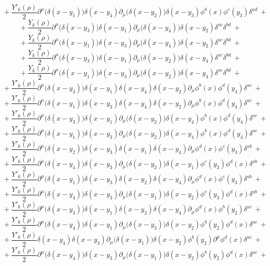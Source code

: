 $$+\ \frac{Y'_k(\rho)}{2}\partial^\mu\big(\delta(x - y_1)\big)\delta(x - y_4)\partial_\mu\big(\delta(x - y_2)\big)\delta(x - y_3)\phi^b(x)\phi^c(y_3)\delta^{ad} \ +$$
$$+\ \frac{Y_k(\rho)}{2}\partial^\mu\big(\delta(x - y_3)\big)\delta(x - y_1)\partial_\mu\big(\delta(x - y_4)\big)\delta(x - y_2)\delta^{ac}\delta^{bd} \ +$$
$$+\ \frac{Y_k(\rho)}{2}\partial^\mu\big(\delta(x - y_1)\big)\delta(x - y_3)\partial_\mu\big(\delta(x - y_4)\big)\delta(x - y_2)\delta^{ac}\delta^{bd} \ +$$
$$+\ \frac{Y_k(\rho)}{2}\partial^\mu\big(\delta(x - y_3)\big)\delta(x - y_1)\partial_\mu\big(\delta(x - y_2)\big)\delta(x - y_4)\delta^{ac}\delta^{bd} \ +$$
$$+\ \frac{Y_k(\rho)}{2}\partial^\mu\big(\delta(x - y_1)\big)\delta(x - y_3)\partial_\mu\big(\delta(x - y_2)\big)\delta(x - y_4)\delta^{ac}\delta^{bd} \ +$$
$$+\ \frac{Y'_k(\rho)}{2}\partial^\mu\big(\delta(x - y_3)\big)\delta(x - y_1)\delta(x - y_4)\delta(x - y_2)\partial_\mu\phi^b(x)\phi^d(y_4)\delta^{ac} \ +$$
$$+\ \frac{Y'_k(\rho)}{2}\partial^\mu\big(\delta(x - y_1)\big)\delta(x - y_3)\delta(x - y_4)\delta(x - y_2)\partial_\mu\phi^b(x)\phi^d(y_4)\delta^{ac} \ +$$
$$+\ \frac{Y'_k(\rho)}{2}\partial^\mu\big(\delta(x - y_3)\big)\delta(x - y_1)\partial_\mu\big(\delta(x - y_2)\big)\delta(x - y_4)\phi^b(x)\phi^d(y_4)\delta^{ac} \ +$$
$$+\ \frac{Y'_k(\rho)}{2}\partial^\mu\big(\delta(x - y_1)\big)\delta(x - y_3)\partial_\mu\big(\delta(x - y_2)\big)\delta(x - y_4)\phi^b(x)\phi^d(y_4)\delta^{ac} \ +$$
$$+\ \frac{Y'_k(\rho)}{2}\partial^\mu\big(\delta(x - y_2)\big)\delta(x - y_3)\delta(x - y_1)\delta(x - y_4)\partial_\mu\phi^d(x)\phi^c(y_3)\delta^{ab} \ +$$
$$+\ \frac{Y'_k(\rho)}{2}\partial^\mu\big(\delta(x - y_4)\big)\delta(x - y_3)\partial_\mu\big(\delta(x - y_2)\big)\delta(x - y_1)\phi^c(y_3)\phi^d(x)\delta^{ab} \ +$$
$$+\ \frac{Y'_k(\rho)}{2}\partial^\mu\big(\delta(x - y_1)\big)\delta(x - y_3)\delta(x - y_2)\delta(x - y_4)\partial_\mu\phi^d(x)\phi^c(y_3)\delta^{ab} \ +$$
$$+\ \frac{Y'_k(\rho)}{2}\partial^\mu\big(\delta(x - y_4)\big)\delta(x - y_3)\partial_\mu\big(\delta(x - y_1)\big)\delta(x - y_2)\phi^c(y_3)\phi^d(x)\delta^{ab} \ +$$
$$+\ \frac{Y'_k(\rho)}{2}\partial^\mu\big(\delta(x - y_3)\big)\delta(x - y_1)\delta(x - y_2)\delta(x - y_4)\partial_\mu\phi^d(x)\phi^b(y_2)\delta^{ac} \ +$$
$$+\ \frac{Y'_k(\rho)}{2}\partial^\mu\big(\delta(x - y_4)\big)\delta(x - y_1)\partial_\mu\big(\delta(x - y_3)\big)\delta(x - y_2)\phi^b(y_2)\phi^d(x)\delta^{ac} \ +$$
$$+\ \frac{Y'_k(\rho)}{2}\delta(x - y_4)\delta(x - y_3)\partial_\mu\big(\delta(x - y_1)\big)\delta(x - y_2)\phi^b(y_2)\partial^\mu\phi^d(x)\delta^{ac} \ +$$
$$+\ \frac{Y'_k(\rho)}{2}\partial^\mu\big(\delta(x - y_4)\big)\delta(x - y_3)\partial_\mu\big(\delta(x - y_1)\big)\delta(x - y_2)\phi^b(y_2)\phi^d(x)\delta^{ac} \ +$$
